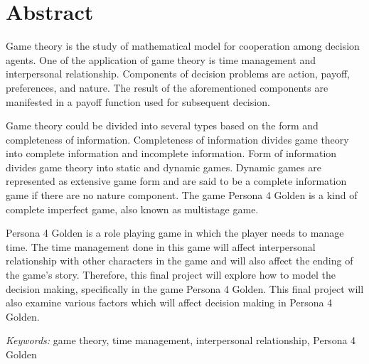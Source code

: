 \clearpage
\chapter*{Abstract}

Game theory is the study of mathematical model for cooperation among decision agents. One of the application of game theory is time management and interpersonal relationship. Components of decision problems are action, payoff, preferences, and nature. The result of the aforementioned components are manifested in a payoff function used for subsequent decision.

Game theory could be divided into several types based on the form and completeness of information. Completeness of information divides game theory into complete information and incomplete information. Form of information divides game theory into static and dynamic games. Dynamic games are represented as extensive game form and are said to be a complete information game if there are no nature component. The game Persona 4 Golden is a kind of complete imperfect game, also known as multistage game.

Persona 4 Golden is a role playing game in which the player needs to manage time. The time management done in this game will affect interpersonal relationship with other characters in the game and will also affect the ending of the game's story. Therefore, this final project will explore how to model the decision making, specifically in the game Persona 4 Golden. This final project will also examine various factors which will affect decision making in Persona 4 Golden.

\textit{Keywords:} game theory, time management, interpersonal relationship, Persona 4 Golden